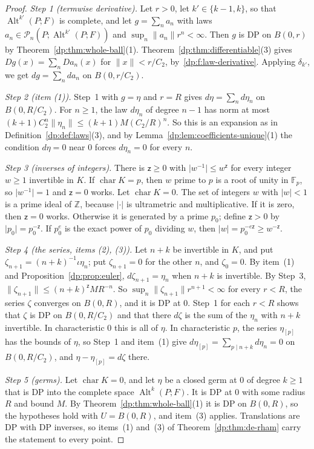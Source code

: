 \documentclass[11pt]{amsart}
\theoremstyle{definition}
\theoremstyle{remark}
\numberwithin{equation}{section}
\newcommand{\Z}{\mathbb Z}
\newcommand{\F}{\mathbb F}
\newcommand{\Alt}{\operatorname{Alt}}
\newcommand{\abs}[1]{\lvert #1\rvert}
\newcommand{\norm}[1]{\lVert #1\rVert}
\theoremstyle{plain}
\theoremstyle{definition}
\theoremstyle{plain}
\newcommand{\cP}{\mathcal P}
\begin{document}
\begin{proof}
\emph{Step 1 (termwise derivative).} Let $r>0$, let $k'\in\{k-1,k\}$, so that $\Alt^{k'}(P;F)$ is complete, and let $g=\sum_na_n$ with laws $a_n\in\cP_n(P;\Alt^{k'}(P;F))$ and $\sup_n\norm{a_n}r^n<\infty$. Then $g$ is DP on $B(0,r)$ by Theorem~\ref{dp:thm:whole-ball}(1). Theorem~\ref{dp:thm:differentiable}(3) gives $Dg(x)=\sum_nDa_n(x)$ for $\norm x<r/C_2$, by~\eqref{dp:f:law-derivative}. Applying $\delta_{k'}$, we get $dg=\sum_nda_n$ on $B(0,r/C_2)$.

\emph{Step 2 (item (1)).} Step~1 with $g=\eta$ and $r=R$ gives $d\eta=\sum_nd\eta_n$ on $B(0,R/C_2)$. For $n\ge1$, the law $d\eta_n$ of degree $n-1$ has norm at most $(k+1)C_2^n\norm{\eta_n}\le(k+1)M(C_2/R)^n$. So this is an expansion as in Definition~\ref{dp:def:laws}(3), and by Lemma~\ref{dp:lem:coefficients-unique}(1) the condition $d\eta=0$ near $0$ forces $d\eta_n=0$ for every $n$.

\emph{Step 3 (inverses of integers).} There is $\mathsf z\ge0$ with $\abs{w^{-1}}\le w^{\mathsf z}$ for every integer $w\ge1$ invertible in $K$. If $\operatorname{char}K=p$, then $w$ prime to $p$ is a root of unity in $\F_p$, so $\abs{w^{-1}}=1$ and $\mathsf z=0$ works. Let $\operatorname{char}K=0$. The set of integers $w$ with $\abs w<1$ is a prime ideal of $\Z$, because $\abs{\cdot}$ is ultrametric and multiplicative. If it is zero, then $\mathsf z=0$ works. Otherwise it is generated by a prime $p_0$; define $\mathsf z>0$ by $\abs{p_0}=p_0^{-\mathsf z}$. If $p_0^e$ is the exact power of $p_0$ dividing $w$, then $\abs w=p_0^{-e\mathsf z}\ge w^{-\mathsf z}$.

\emph{Step 4 (the series, items (2), (3)).} Let $n+k$ be invertible in $K$, and put $\zeta_{n+1}=(n+k)^{-1}\iota\eta_n$; put $\zeta_{n+1}=0$ for the other $n$, and $\zeta_0=0$. By item~(1) and Proposition~\ref{dp:prop:euler}, $d\zeta_{n+1}=\eta_n$ when $n+k$ is invertible. By Step~3, $\norm{\zeta_{n+1}}\le(n+k)^{\mathsf z}MR^{-n}$. So $\sup_n\norm{\zeta_{n+1}}r^{n+1}<\infty$ for every $r<R$, the series $\zeta$ converges on $B(0,R)$, and it is DP at $0$. Step~1 for each $r<R$ shows that $\zeta$ is DP on $B(0,R/C_2)$ and that there $d\zeta$ is the sum of the $\eta_n$ with $n+k$ invertible. In characteristic $0$ this is all of $\eta$. In characteristic $p$, the series $\eta_{[p]}$ has the bounds of $\eta$, so Step~1 and item~(1) give $d\eta_{[p]}=\sum_{p\mid n+k}d\eta_n=0$ on $B(0,R/C_2)$, and $\eta-\eta_{[p]}=d\zeta$ there.

\emph{Step 5 (germs).} Let $\operatorname{char}K=0$, and let $\eta$ be a closed germ at $0$ of degree $k\ge1$ that is DP into the complete space $\Alt^k(P;F)$. It is DP at $0$ with some radius $R$ and bound $M$. By Theorem~\ref{dp:thm:whole-ball}(1) it is DP on $B(0,R)$, so the hypotheses hold with $U=B(0,R)$, and item~(3) applies. Translations are DP with DP inverses, so items~(1) and~(3) of Theorem~\ref{dp:thm:de-rham} carry the statement to every point.
\end{proof}
\end{document}
